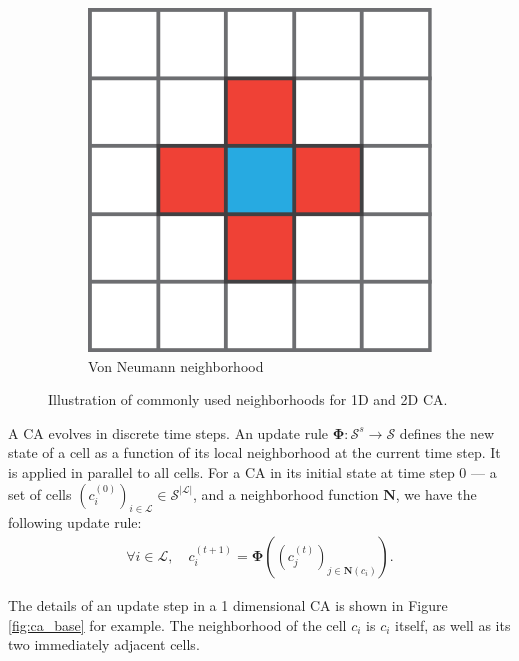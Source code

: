 \begin{figure}[htbp]
\begin{subfigure}[c]{.3\linewidth}
    \includegraphics[width=\linewidth]{figures/von_neumann}
    \caption{Von Neumann neighborhood}
    \label{fig:von_neumann}
  \end{subfigure}

  \caption{Illustration of commonly used neighborhoods for 1D and 2D \ac{CA}.}
  \label{fig:neighborhoods}
\end{figure}

A \ac{CA} evolves in discrete time steps. An update rule
$\boldsymbol{\Phi}: \mathcal{S}^{s} \rightarrow \mathcal{S}$ defines the new state of a cell as a
function of its local neighborhood at the current time step. It is applied in
parallel to all cells. For a \ac{CA} in its initial state at time
step 0 --- \ie a set of cells $\left(c_{i}^{(0)}\right)_{i \in \mathcal{L}} \in \mathcal{S}^{|\mathcal{L}|}$, and a
neighborhood function $\boldsymbol{N}$, we have the following update rule:
\begin{equation}
\begin{aligned}
\forall i \in \mathcal{L}, \quad c_{i}^{(t + 1)} = \boldsymbol{\Phi}\left(
\left(c_{j}^{(t)}\right)_{j \in \boldsymbol{N}(c_i)}\right).
\end{aligned}
\end{equation}

The details of an update step in a 1 dimensional \ac{CA} is shown in Figure
\ref{fig:ca_base} for example. The neighborhood of the cell $c_{i}$ is $c_{i}$
itself, as well as its two immediately adjacent cells.


